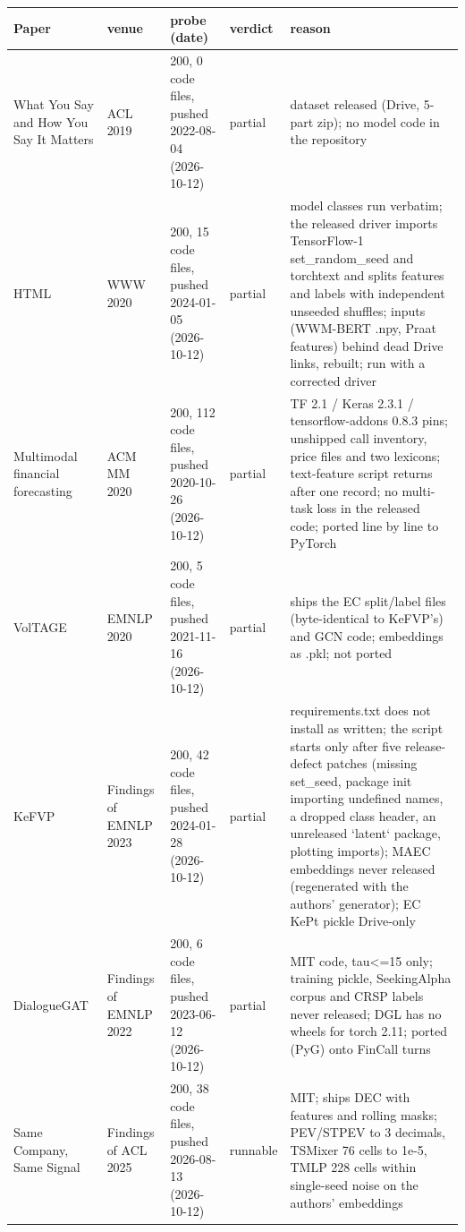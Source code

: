 \begin{table}[t]
\centering\scriptsize
\setlength{\tabcolsep}{3pt}
\begin{tabular}{p{3.3cm}p{1.7cm}p{2.9cm}lp{6.0cm}}
\toprule
Paper & venue & probe (date) & verdict & reason \\
\midrule
What You Say and How You Say It Matters \citep{qin2019what} & ACL 2019 & 200, 0 code files, pushed 2022-08-04 (2026-10-12) & partial & dataset released (Drive, 5-part zip); no model code in the repository \\
HTML \citep{yang2020html} & WWW 2020 & 200, 15 code files, pushed 2024-01-05 (2026-10-12) & partial & model classes run verbatim; the released driver imports TensorFlow-1 set\_random\_seed and torchtext and splits features and labels with independent unseeded shuffles; inputs (WWM-BERT .npy, Praat features) behind dead Drive links, rebuilt; run with a corrected driver \\
Multimodal financial forecasting \citep{sawhney2020mm} & ACM MM 2020 & 200, 112 code files, pushed 2020-10-26 (2026-10-12) & partial & TF 2.1 / Keras 2.3.1 / tensorflow-addons 0.8.3 pins; unshipped call inventory, price files and two lexicons; text-feature script returns after one record; no multi-task loss in the released code; ported line by line to PyTorch \\
VolTAGE \citep{sawhney2020voltage} & EMNLP 2020 & 200, 5 code files, pushed 2021-11-16 (2026-10-12) & partial & ships the EC split/label files (byte-identical to KeFVP's) and GCN code; embeddings as .pkl; not ported \\
KeFVP \citep{niu2023kefvp} & Findings of EMNLP 2023 & 200, 42 code files, pushed 2024-01-28 (2026-10-12) & partial & requirements.txt does not install as written; the script starts only after five release-defect patches (missing set\_seed, package init importing undefined names, a dropped class header, an unreleased `latent` package, plotting imports); MAEC embeddings never released (regenerated with the authors' generator); EC KePt pickle Drive-only \\
DialogueGAT \citep{sang2022dialoguegat} & Findings of EMNLP 2022 & 200, 6 code files, pushed 2023-06-12 (2026-10-12) & partial & MIT code, tau<=15 only; training pickle, SeekingAlpha corpus and CRSP labels never released; DGL has no wheels for torch 2.11; ported (PyG) onto FinCall turns \\
Same Company, Same Signal \citep{scss2024} & Findings of ACL 2025 & 200, 38 code files, pushed 2026-08-13 (2026-10-12) & runnable & MIT; ships DEC with features and rolling masks; PEV/STPEV to 3 decimals, TSMixer 76 cells to 1e-5, TMLP 228 cells within single-seed noise on the authors' embeddings \\

\end{tabular}
\end{table}
